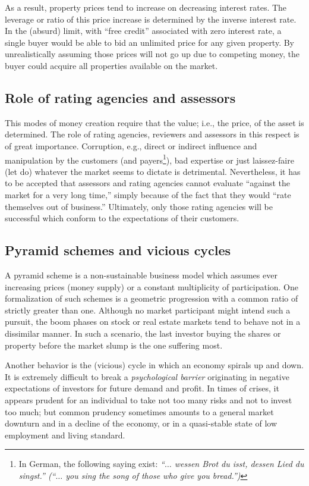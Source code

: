 \documentclass[aps,rmp,preprint,amsfonts,showpacs,showkeys]{revtex4}
\begin{document}
As a result, property prices tend to increase on decreasing interest rates.
The leverage or ratio of this price increase is determined by the inverse interest rate.
In the (absurd) limit, with ``free credit'' associated with zero interest rate,
a single buyer would be able to bid an unlimited price for any given property.
By unrealistically assuming those prices will not go up due to competing money,
the buyer could acquire all properties available on the market.


\subsection{Role of rating agencies and assessors}
This modes of money creation require that the value; i.e., the price, of the asset is determined.
The role of rating agencies, reviewers and assessors in this respect is of great importance.
Corruption, e.g., direct or indirect influence
and manipulation by the customers (and payers\footnote{In German,
the following saying exist: {\em ``$\ldots$ wessen Brot du isst, dessen Lied du singst.''
(``$\ldots$ you sing the song of those who give you bread.'')}}),
 bad expertise or just laissez-faire (let do) whatever the market seems
to dictate is detrimental.
Nevertheless, it has to be accepted that assessors and rating agencies cannot evaluate ``against
the market for a very long time,'' simply because of the fact that they
would ``rate themselves out of business.''
Ultimately, only those rating agencies will be successful which
conform to the expectations of their customers.


\subsection{Pyramid schemes and vicious cycles}
A pyramid scheme is a non-sustainable business model which assumes ever increasing prices (money supply)
or a constant multiplicity of participation.
One formalization of such schemes is a geometric progression with a common ratio of strictly greater than one.
Although no market participant might intend such a pursuit, the boom phases on stock or real estate markets
tend to behave not in a dissimilar manner. In such a scenario, the last investor buying the shares or property before the market slump is the one suffering most.


Another behavior is the (vicious) cycle  \cite{soros-alchemy,2006-Binswanger} in which an economy spirals up
and down.
It is extremely difficult to break a {\em psychological barrier} originating in negative expectations of investors for future demand and profit.
In times of crises, it appears prudent for an individual to take not too many risks and not to invest too much; but common prudency
sometimes amounts to a general market downturn and in a decline of the economy, or in a quasi-stable state of low employment and living standard.
\end{document}

